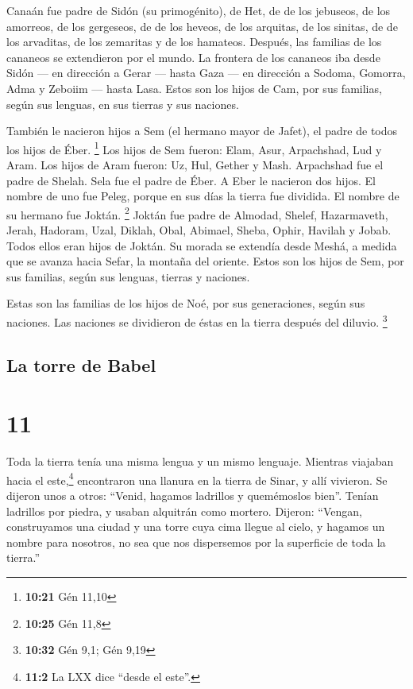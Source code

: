  Canaán fue padre de Sidón (su primogénito), de Het, de
 de los jebuseos, de los amorreos, de los gergeseos, de
 de los heveos, de los arquitas, de los sinitas, de
 de los arvaditas, de los zemaritas y de los hamateos.
Después, las familias de los cananeos se extendieron por el mundo.
 La frontera de los cananeos iba desde Sidón --- en
dirección a Gerar --- hasta Gaza --- en dirección a Sodoma, Gomorra,
Adma y Zeboiim --- hasta Lasa.  Estos son los hijos de
Cam, por sus familias, según sus lenguas, en sus tierras y sus naciones.

 También le nacieron hijos a Sem (el hermano mayor de
Jafet), el padre de todos los hijos de Éber. \footnote{\textbf{10:21}
  Gén 11,10}  Los hijos de Sem fueron: Elam, Asur,
Arpachshad, Lud y Aram.  Los hijos de Aram fueron: Uz,
Hul, Gether y Mash.  Arpachshad fue el padre de Shelah.
Sela fue el padre de Éber.  A Eber le nacieron dos hijos.
El nombre de uno fue Peleg, porque en sus días la tierra fue dividida.
El nombre de su hermano fue Joktán. \footnote{\textbf{10:25} Gén 11,8}
 Joktán fue padre de Almodad, Shelef, Hazarmaveth, Jerah,
 Hadoram, Uzal, Diklah,  Obal, Abimael,
Sheba,  Ophir, Havilah y Jobab. Todos ellos eran hijos de
Joktán.  Su morada se extendía desde Meshá, a medida que
se avanza hacia Sefar, la montaña del oriente.  Estos son
los hijos de Sem, por sus familias, según sus lenguas, tierras y
naciones.

 Estas son las familias de los hijos de Noé, por sus
generaciones, según sus naciones. Las naciones se dividieron de éstas en
la tierra después del diluvio. \footnote{\textbf{10:32} Gén 9,1; Gén
  9,19}

\hypertarget{la-torre-de-babel}{%
\subsection{La torre de Babel}\label{la-torre-de-babel}}

\hypertarget{section-10}{%
\section{11}\label{section-10}}

 Toda la tierra tenía una misma lengua y un mismo
lenguaje.  Mientras viajaban hacia el este,\footnote{\textbf{11:2}
  La LXX dice ``desde el este''.} encontraron una llanura en la tierra
de Sinar, y allí vivieron.  Se dijeron unos a otros:
``Venid, hagamos ladrillos y quemémoslos bien''. Tenían ladrillos por
piedra, y usaban alquitrán como mortero.  Dijeron:
``Vengan, construyamos una ciudad y una torre cuya cima llegue al cielo,
y hagamos un nombre para nosotros, no sea que nos dispersemos por la
superficie de toda la tierra.''

